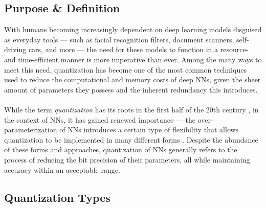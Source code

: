 \subsection{Purpose \& Definition}
\label{subsec:subsection1}
With humans becoming increasingly dependent on deep learning models disguised as everyday tools — such as facial recognition filters, 
document scanners, self-driving cars, and more — the need for these models to function in a resource- and 
time-efficient manner is more imperative than ever. Among the many ways to meet this need, 
quantization has become one of the most common techniques used to reduce the computational 
and memory costs of deep NNs, given the sheer amount of parameters they possess and the inherent redundancy this introduces.
\\
\\
While the term \textit{quantization} has its roots in the first half of the 20th century \cite{gray1998quantization}, in the context of NNs, 
it has gained renewed importance  — the over-parameterization of NNs introduces a certain type of flexibility 
that allows quantization to be implemented in many different forms \cite{gholami2021survey}.
Despite the abundance of these forms and approaches, quantization of NNs generally refers to the process of 
reducing the bit precision of their parameters, all while maintaining accuracy within an acceptable range.

\subsection{Quantization Types}
\label{subsec:subsection2}

